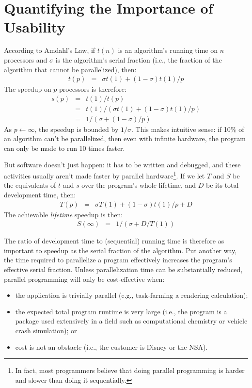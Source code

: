 \section{Quantifying the Importance of Usability\label{s:quant}}

According to Amdahl's Law,
if $t(n)$ is an algorithm's running time on $n$ processors
and $\sigma$ is the algorithm's serial fraction
(i.e., the fraction of the algorithm that cannot be parallelized),
then:
\begin{eqnarray*}
t(p) & = & {\sigma}t(1) + (1 - {\sigma})t(1)/p
\end{eqnarray*}
The speedup on $p$ processors is therefore:
\begin{eqnarray*}
s(p) & = & t(1)/t(p) \\
     & = & t(1)/({\sigma}t(1) + (1 - {\sigma})t(1)/p) \\
     & = & 1/({\sigma} + (1 - {\sigma})/p)
\end{eqnarray*}
As $p{\leftarrow}{\infty}$, the speedup is bounded by $1/{\sigma}$.
This makes intuitive sense:
if 10\% of an algorithm can't be parallelized,
then even with infinite hardware,
the program can only be made to run 10 times faster.

But software doesn't just happen:
it has to be written and debugged,
and these activities usually aren't made faster by parallel hardware\footnote{In fact,
most programmers believe that doing parallel programming is harder and slower than doing it sequentially.}.
If we let $T$ and $S$ be the equivalents of $t$ and $s$ over the program's whole lifetime,
and $D$ be its total development time,
then:
\begin{eqnarray*}
T(p) & = & {\sigma}T(1) + (1 - {\sigma})t(1)/p + D
\end{eqnarray*}
The achievable \emph{lifetime} speedup is then:
\begin{eqnarray*}
S(\infty) & = & 1/({\sigma} + D/T(1))
\end{eqnarray*}

The ratio of development time to (sequential) running time is therefore as important to speedup
as the serial fraction of the algorithm.
Put another way,
the time required to parallelize a program effectively increases the program's effective serial fraction.
Unless parallelization time can be substantially reduced,
parallel programming will only be cost-effective when:
\begin{itemize}
\item	the application is trivially parallel (e.g., task-farming a rendering calculation);
\item	the expected total program runtime is very large
	(i.e., the program is a package used extensively in a field
	such as computational chemistry or vehicle crash simulation);
	or
\item	cost is not an obstacle (i.e., the customer is Disney or the NSA).
\end{itemize}

